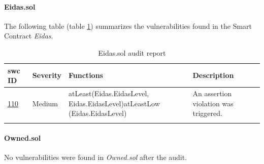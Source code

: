 \documentclass[a4paper, 12pt]{article} %
\begin{document}
            \paragraph{Eidas.sol}
                The following table (table \ref{tab:Eidas}) summarizes the vulnerabilities found in the Smart Contract \textit{Eidas}.
                \begin{longtable}{||p{0.1\linewidth} | p{0.11\linewidth} | p{0.50\linewidth} | p{0.30\linewidth}||}
                    \hline
                    \textbf{\acrshort{swc} ID} & \textbf{Severity} & \textbf{Functions} & \textbf{Description} \\ [0.5ex] 
                    \hline\hline
                    \href{https://swcregistry.io/docs/SWC-110}{110} & Medium & atLeast\newline (Eidas.EidasLevel, Eidas.EidasLevel)\newline atLeastLow (Eidas.EidasLevel) & An assertion violation was triggered.\\ [1ex] 
                    \hline
                    \caption{Eidas.sol audit report}
                    \label{tab:Eidas}
                \end{longtable}
                
            \paragraph{Owned.sol}
                No vulnerabilities were found in \textit{Owned.sol} after the audit.\\
\end{document}
